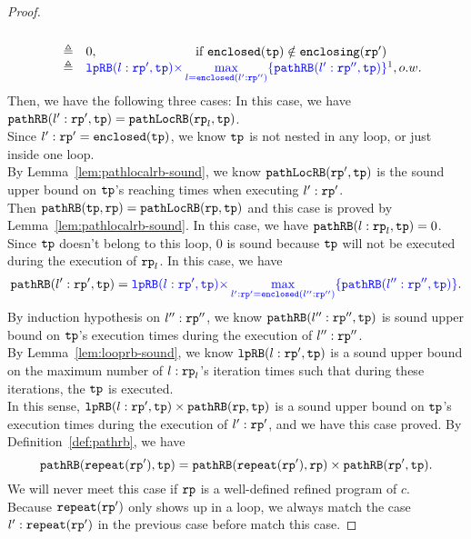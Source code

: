 \begin{proof}
\[\begin{array}{rcl}
\\ &  \triangleq & 
0, \qquad \qquad \qquad \quad ~~ \text{if }  \kw{enclosed}(\tpath) \notin \kw{enclosing}(\rprog')
\\ &  \triangleq & 
\highlight{
  \lpchB(l:\rprog', \tpath ) }
\highlight{\times \max\limits_{l = \kw{enclosed}(l':\rprog'')}
\{\inoutB(l':\rprog'', \tpath)\} } \footnotemark, o.w. 
\end{array}
\]
%
Then, we have the following three cases:
In this case, we have $\mathtt{pathRB}(l': \mathtt{rp}', \mathtt{tp}) = {\mathtt{pathLocRB}(\mathtt{rp}_l, \mathtt{tp})}$.
\\
Since $l': \mathtt{rp}' = \mathtt{enclosed}(\mathtt{tp})$, we know $\mathtt{tp}$ is not nested in any loop, or just inside one loop.
\\
By Lemma~\ref{lem:pathlocalrb-sound}, we know $\mathtt{pathLocRB}(\mathtt{rp}', \mathtt{tp})$ is the
sound upper bound on $\mathtt{tp}$'s reaching times when executing $l': \mathtt{rp}'$.
\\
Then $\mathtt{pathRB}(\mathtt{tp}, \mathtt{rp}) = \mathtt{pathLocRB}(\mathtt{rp}, \mathtt{tp})$ and this case is proved by Lemma~\ref{lem:pathlocalrb-sound}.
%
In this case, we have $\mathtt{pathRB}(l: \mathtt{rp}_l, \mathtt{tp}) = 0$.
\\
Since $\mathtt{tp}$ doesn't belong to this loop, $0$ is sound because $\mathtt{tp}$ will not be executed during the execution of $\mathtt{rp}_l$.
%
In this case, we have 
\[
  \inoutB(l': \rprog', \tpath) = \highlight{ \lpchB(l:\rprog', \tpath) }
\highlight{\times \max\limits_{l':\rprog' = \kw{enclosed}(l'':\rprog'')} \{\inoutB(l'':\rprog'', \tpath)\} }.
\]
By induction hypothesis on $l'':\mathtt{rp}''$, we know  $\mathtt{pathRB}(l'':\mathtt{rp}'', \mathtt{tp})$ is sound upper bound on $\mathtt{tp}$'s execution times during the execution of $l'':\mathtt{rp}''$.
\\
By Lemma~\ref{lem:looprb-sound}, we know $\mathtt{lpRB}(l:\mathtt{rp}', \mathtt{tp})$ is a sound upper bound on the maximum number of $l: \mathtt{rp}_l$'s iteration times such that during these iterations, the $\mathtt{tp}$ is executed.
\\
In this sense, $\mathtt{lpRB}(l:\mathtt{rp}', \mathtt{tp}) \times \mathtt{pathRB}(\mathtt{rp}, \mathtt{tp})$ is a sound upper bound on $\mathtt{tp}$'s execution times during the execution of $l': \mathtt{rp}'$, and we have this case proved.
%
By Definition~\ref{def:pathrb}, we have
\[
  \mathtt{pathRB}(\mathtt{repeat}(\mathtt{rp}'), \mathtt{tp}) = \mathtt{pathRB}(\mathtt{repeat}(\mathtt{rp}'), \mathtt{rp}) \times \mathtt{pathRB}(\mathtt{rp}', \mathtt{tp}).
\]
We will never meet this case if $\mathtt{rp}$ is a well-defined refined program of $c$.
\\
Because $\mathtt{repeat}(\mathtt{rp}')$ only shows up in a loop, we always match the case $l' : \mathtt{repeat}(\mathtt{rp}')$ in the previous case before match this case.
%
\end{proof}



